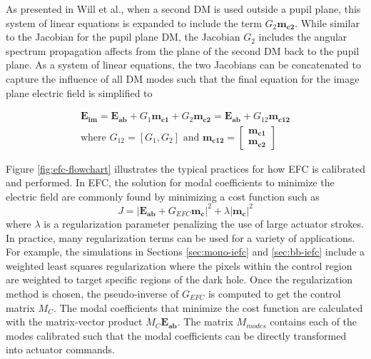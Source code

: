 \documentclass[12pt]{spieman}  %
\begin{document}
\begin{spacing}{2}
As presented in Will et al.\cite{will-adefc-2021}, when a second DM is used outside a pupil plane, this system of linear equations is expanded to include the term $G_2 \mathbf{m_{c2}}$. While similar to the Jacobian for the pupil plane DM, the Jacobian $G_2$ includes the angular spectrum propagation affects from the plane of the second DM back to the pupil plane. As a system of linear equations, the two Jacobians can be concatenated to capture the influence of all DM modes such that the final equation for the image plane electric field is simplified to

\begin{equation}
    \label{eq:efc-3}
    \begin{split}
    \mathbf{E_{im}} = \mathbf{E_{ab}} + G_1 \mathbf{m_{c1}} + G_2 \mathbf{m_{c2}} = \mathbf{E_{ab}} + G_{12} \mathbf{m_{c12}} 
    \\
    \text{where } G_{12} = [G_1, G_2] \text{ and } \mathbf{m_{c12}} = \begin{bmatrix}\mathbf{m_{c1}} \\\mathbf{m_{c2}}\end{bmatrix}
    \end{split}
\end{equation}

Figure \ref{fig:efc-flowchart} illustrates the typical practices for how EFC is calibrated and performed. In EFC, the solution for modal coefficients to minimize the electric field are commonly found by minimizing a cost function such as 
\begin{equation}
    J = |\mathbf{E_{ab}} + G_{EFC}\mathbf{m_c}|^2  + \lambda|\mathbf{m_c}|^2
\end{equation}
\noindent where $\lambda$ is a regularization parameter penalizing the use of large actuator strokes. In practice, many regularization terms can be used for a variety of applications. For example, the simulations in Sections \ref{sec:mono-iefc} and \ref{sec:bb-iefc} include a weighted least squares regularization where the pixels within the control region are weighted to target specific regions of the dark hole. Once the regularization method is chosen, the pseudo-inverse of $G_{EFC}$ is computed to get the control matrix $M_C$. The modal coefficients that minimize the cost function are calculated with the matrix-vector product $M_C\mathbf{E_{ab}}$. The matrix $M_{modes}$ contains each of the modes calibrated such that the modal coefficients can be directly transformed into actuator commands. 


\end{spacing}
\end{document}
